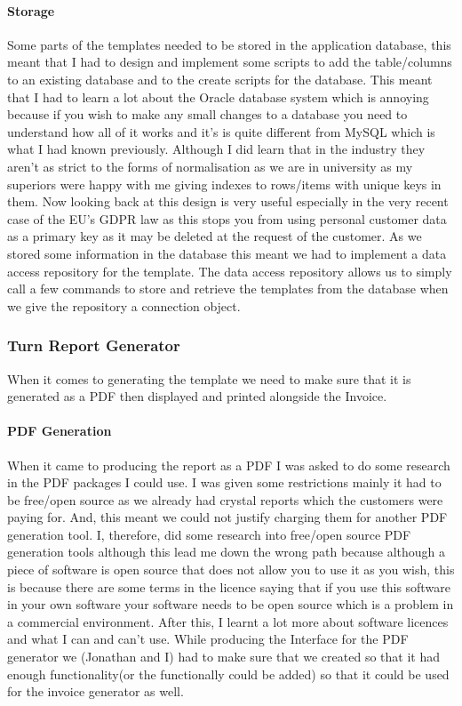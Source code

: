 {{		\paragraph{Storage}{Some parts of the templates needed to be stored in the application database, this meant that I had to design and implement some scripts to add the table/columns to an existing database and to the create scripts for the database. This meant that I had to learn a lot about the Oracle database system which is annoying because if you wish to make any small changes to a database you need to understand how all of it works and it's is quite different from MySQL which is what I had known previously. Although I did learn that in the industry they aren't as strict to the forms of normalisation as we are in university as my superiors were happy with me giving indexes to rows/items with unique keys in them. Now looking back at this design is very useful especially in the very recent case of the EU's GDPR law as this stops you from using personal customer data as a primary key as it may be deleted at the request of the customer. As we stored some information in the database this meant we had to implement a data access repository for the template. The data access repository allows us to simply call a few commands to store and retrieve the templates from the database when we give the repository a connection object.}
	}
	\subsubsection*{Turn Report Generator}{
		When it comes to generating the template we need to make sure that it is generated as a PDF then displayed and printed alongside the Invoice.
		\paragraph{PDF Generation}{
			When it came to producing the report as a PDF I was asked to do some research in the PDF packages I could use. I was given some restrictions mainly it had to be free/open source as we already had crystal reports which the customers were paying for. And, this meant we could not justify charging them for another PDF generation tool. I, therefore, did some research into free/open source PDF generation tools although this lead me down the wrong path because although a piece of software is open source that does not allow you to use it as you wish, this is because there are some terms in the licence saying that if you use this software in your own software your software needs to be open source which is a problem in a commercial environment. After this, I learnt a lot more about software licences and what I can and can't use. While producing the Interface for the PDF generator we (Jonathan and I) had to make sure that we created so that it had enough functionality(or the functionally could be added) so that it could be used for the invoice generator as well.
		}
}}
